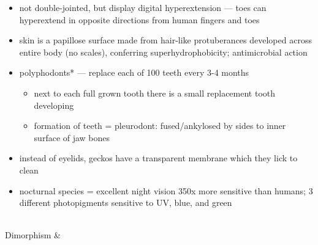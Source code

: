 \begin{center}
\begin{longtabu}
\begin{itemize}[noitemsep]
\begin{itemize}[noitemsep]
			\end{itemize}
		\item not double-jointed, but display digital hyperextension --- toes can hyperextend in opposite directions from human fingers and toes
		\item skin is a papillose surface made from hair-like protuberances developed across entire body (no scales), conferring superhydrophobicity; antimicrobial action
		\item polyphodonts* --- replace each of 100 teeth every 3-4 months
			\begin{itemize}[noitemsep]
				\item next to each full grown tooth there is a small replacement tooth developing
				\item formation of teeth = pleurodont: fused/ankylosed by sides to inner surface of jaw bones
			\end{itemize}
		\item instead of eyelids, geckos have a transparent membrane which they lick to clean
		\item nocturnal species = excellent night vision 350x more sensitive than humans; 3 different photopigments sensitive to UV, blue, and green
	\end{itemize}
	 \\
	\hline
	Dimorphism & 
	

\end{longtabu}
\end{center}

